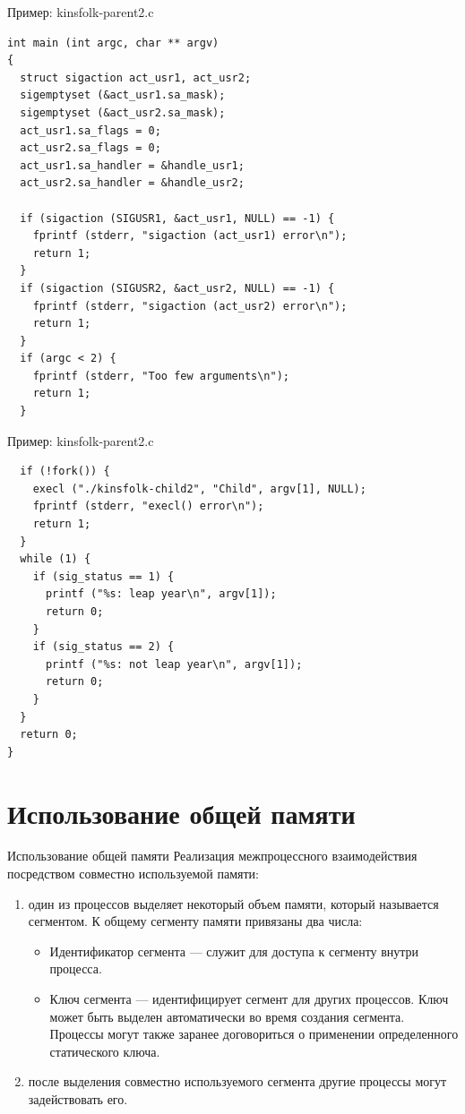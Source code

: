 \documentclass[xcolor=table]{beamer}
\begin{document}
\begin{frame}[fragile]{Пример: kinsfolk-parent2.c}
	\linespread{0.8}
	\begin{verbatim}
int main (int argc, char ** argv)
{
  struct sigaction act_usr1, act_usr2;
  sigemptyset (&act_usr1.sa_mask);
  sigemptyset (&act_usr2.sa_mask);
  act_usr1.sa_flags = 0;
  act_usr2.sa_flags = 0;
  act_usr1.sa_handler = &handle_usr1;
  act_usr2.sa_handler = &handle_usr2;

  if (sigaction (SIGUSR1, &act_usr1, NULL) == -1) {
    fprintf (stderr, "sigaction (act_usr1) error\n");
    return 1;
  }
  if (sigaction (SIGUSR2, &act_usr2, NULL) == -1) {
    fprintf (stderr, "sigaction (act_usr2) error\n");
    return 1;
  }
  if (argc < 2) {
    fprintf (stderr, "Too few arguments\n");
    return 1;
  }	
	\end{verbatim}
\end{frame}

\begin{frame}[fragile]{Пример: kinsfolk-parent2.c}
	\linespread{0.8}
	\begin{verbatim}
  if (!fork()) {
    execl ("./kinsfolk-child2", "Child", argv[1], NULL);
    fprintf (stderr, "execl() error\n");
    return 1;
  }
  while (1) {
    if (sig_status == 1) {
      printf ("%s: leap year\n", argv[1]);
      return 0;
    }
    if (sig_status == 2) {
      printf ("%s: not leap year\n", argv[1]);
      return 0;
    }
  }
  return 0;
}	
	\end{verbatim}
\end{frame}

\section{Использование общей памяти}

\begin{frame}[fragile]{Использование общей памяти}
	Реализация межпроцессного взаимодействия посредством совместно используемой памяти:
	\begin{enumerate}
		\item один из процессов выделяет некоторый объем памяти, который называется сегментом. К общему сегменту памяти привязаны два числа:
		\begin{itemize}
			\item Идентификатор сегмента — служит для доступа к сегменту внутри процесса.
			\item Ключ сегмента — идентифицирует сегмент для других процессов. Ключ может быть выделен автоматически во время создания сегмента. Процессы могут также заранее договориться о применении определенного статического ключа.
		\end{itemize}
		\item после выделения совместно используемого сегмента другие процессы могут задействовать его. 
\end{enumerate}
\end{frame}
\end{document}
